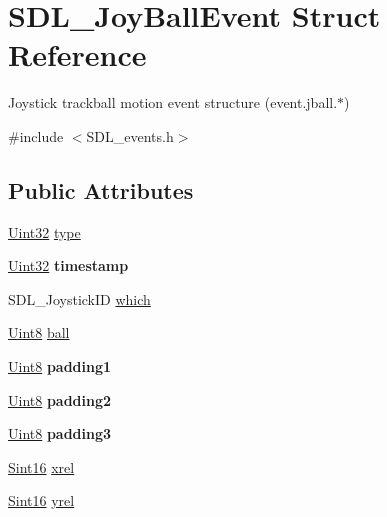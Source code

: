 \hypertarget{struct_s_d_l___joy_ball_event}{}\section{S\+D\+L\+\_\+\+Joy\+Ball\+Event Struct Reference}
\label{struct_s_d_l___joy_ball_event}


Joystick trackball motion event structure (event.\+jball.$\ast$)  




{\ttfamily \#include $<$S\+D\+L\+\_\+events.\+h$>$}

\subsection*{Public Attributes}
\begin{DoxyCompactItemize}
\item 
\hyperlink{_s_d_l__stdinc_8h_add440eff171ea5f55cb00c4a9ab8672d}{Uint32} \hyperlink{struct_s_d_l___joy_ball_event_a0b192b95a043cb494b27ed9b27e84db1}{type}
\item 
\mbox{\label{struct_s_d_l___joy_ball_event_aa8e4fb91af62e316bb9a3219ab76148d}} 
\hyperlink{_s_d_l__stdinc_8h_add440eff171ea5f55cb00c4a9ab8672d}{Uint32} {\bfseries timestamp}
\item 
S\+D\+L\+\_\+\+Joystick\+ID \hyperlink{struct_s_d_l___joy_ball_event_a4e2e185717d529167cd0bea21093c454}{which}
\item 
\hyperlink{_s_d_l__stdinc_8h_a2944638813a090aa23e62f4da842c3e2}{Uint8} \hyperlink{struct_s_d_l___joy_ball_event_add4eb0daeaf95ae56e8c7cfcec560242}{ball}
\item 
\mbox{\label{struct_s_d_l___joy_ball_event_aff75a6519ca2a19cffdc14ebf4626613}} 
\hyperlink{_s_d_l__stdinc_8h_a2944638813a090aa23e62f4da842c3e2}{Uint8} {\bfseries padding1}
\item 
\mbox{\label{struct_s_d_l___joy_ball_event_a0ea3071b99ac096b0157714f01ff04f8}} 
\hyperlink{_s_d_l__stdinc_8h_a2944638813a090aa23e62f4da842c3e2}{Uint8} {\bfseries padding2}
\item 
\mbox{\label{struct_s_d_l___joy_ball_event_acb700712f1a4070bc114ef9d55b00640}} 
\hyperlink{_s_d_l__stdinc_8h_a2944638813a090aa23e62f4da842c3e2}{Uint8} {\bfseries padding3}
\item 
\hyperlink{_s_d_l__stdinc_8h_a9d0257032c0e146ab6121bf0122712f5}{Sint16} \hyperlink{struct_s_d_l___joy_ball_event_a959a8473aa1964e5e1778c27a9ffd261}{xrel}
\item 
\hyperlink{_s_d_l__stdinc_8h_a9d0257032c0e146ab6121bf0122712f5}{Sint16} \hyperlink{struct_s_d_l___joy_ball_event_a28ad48a9eb7a5d3ff62ccba09fcead76}{yrel}
\end{DoxyCompactItemize}


